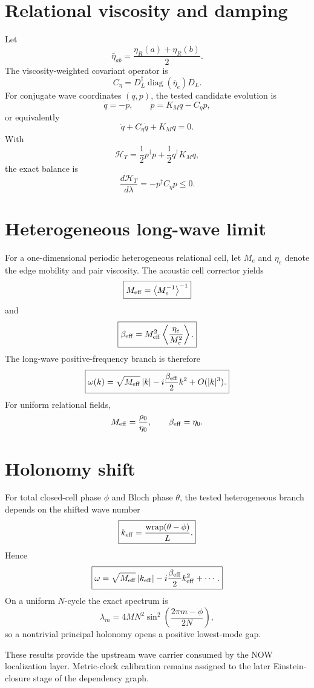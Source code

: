 \section{Relational viscosity and damping}

Let
\[
\bar\eta_{ab}=\frac{\eta_R(a)+\eta_R(b)}2.
\]
The viscosity-weighted covariant operator is
\[
\boxed{
C_\eta
=D_L^\dagger\operatorname{diag}(\bar\eta_e)D_L.
}
\]
For conjugate wave coordinates $(q,p)$, the tested candidate evolution is
\[
\dot q=-p,
\qquad
\dot p=K_Mq-C_\eta p,
\]
or equivalently
\[
\boxed{
\ddot q+C_\eta\dot q+K_Mq=0.
}
\]
With
\[
\mathcal H_T
=\frac12p^\dagger p+\frac12q^\dagger K_Mq,
\]
the exact balance is
\[
\boxed{
\frac{d\mathcal H_T}{d\lambda}
=-p^\dagger C_\eta p\le0.
}
\]

\section{Heterogeneous long-wave limit}

For a one-dimensional periodic heterogeneous relational cell, let $M_e$ and $\eta_e$ denote the edge mobility and pair viscosity.  The acoustic cell corrector yields
\[
\boxed{
M_{\rm eff}
=\left\langle M_e^{-1}\right\rangle^{-1}
}
\]
and
\[
\boxed{
\beta_{\rm eff}
=M_{\rm eff}^2
\left\langle\frac{\eta_e}{M_e^2}\right\rangle.
}
\]
The long-wave positive-frequency branch is therefore
\[
\boxed{
\omega(k)
=\sqrt{M_{\rm eff}}\,|k|
-i\frac{\beta_{\rm eff}}2k^2
+O(|k|^3).
}
\]
For uniform relational fields,
\[
M_{\rm eff}=\frac{\rho_0}{\eta_0},
\qquad
\beta_{\rm eff}=\eta_0.
\]

\section{Holonomy shift}

For total closed-cell phase $\phi$ and Bloch phase $\theta$, the tested heterogeneous branch depends on the shifted wave number
\[
\boxed{
k_{\rm eff}=\frac{\operatorname{wrap}(\theta-\phi)}{L}.
}
\]
Hence
\[
\boxed{
\omega
=\sqrt{M_{\rm eff}}\,|k_{\rm eff}|
-i\frac{\beta_{\rm eff}}2k_{\rm eff}^2+\cdots.
}
\]
On a uniform $N$-cycle the exact spectrum is
\[
\lambda_m
=4MN^2
\sin^2\!\left(\frac{2\pi m-\phi}{2N}\right),
\]
so a nontrivial principal holonomy opens a positive lowest-mode gap.

These results provide the upstream wave carrier consumed by the NOW localization layer.  Metric-clock calibration remains assigned to the later Einstein-closure stage of the dependency graph.

